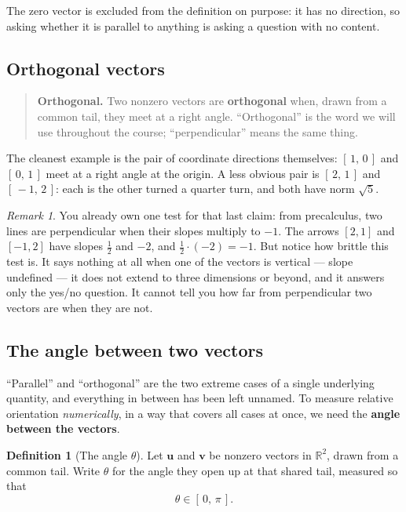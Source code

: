 \documentclass[11pt]{article}
\theoremstyle{definition}
\newtheorem{defn}{Definition}[section]
\theoremstyle{remark}
\newtheorem*{rmk}{Remark}
\newcommand{\R}{\mathbb{R}}
\newcommand{\vc}[1]{\mathbf{#1}}
\begin{document}
\noindent The zero vector is excluded from the definition on purpose: it has no
direction, so asking whether it is parallel to anything is asking a question
with no content.

\subsection{Orthogonal vectors}
\begin{quote}
\textbf{Orthogonal.} Two nonzero vectors are \textbf{orthogonal} when, drawn
from a common tail, they meet at a right angle. ``Orthogonal'' is the word we
will use throughout the course; ``perpendicular'' means the same thing.
\end{quote}

\noindent The cleanest example is the pair of coordinate directions themselves:
$[\,1,\,0\,]$ and $[\,0,\,1\,]$ meet at a right angle at the origin. A less
obvious pair is $[\,2,\,1\,]$ and $[\,-1,\,2\,]$: each is the other turned a
quarter turn, and both have norm $\sqrt5$.

\begin{rmk}
You already own one test for that last claim: from precalculus, two lines are
perpendicular when their slopes multiply to $-1$. The arrows $[2,1]$ and
$[-1,2]$ have slopes $\tfrac12$ and $-2$, and $\tfrac12\cdot(-2)=-1$. But notice
how brittle this test is. It says nothing at all when one of the vectors is
vertical --- slope undefined --- it does not extend to three dimensions or
beyond, and it answers only the yes/no question. It cannot tell you how far from
perpendicular two vectors are when they are not.
\end{rmk}

\subsection{The angle between two vectors}
``Parallel'' and ``orthogonal'' are the two extreme cases of a single underlying
quantity, and everything in between has been left unnamed. To measure relative
orientation \emph{numerically}, in a way that covers all cases at once, we need
the \textbf{angle between the vectors}.

\begin{defn}[The angle $\theta$]
Let $\vc{u}$ and $\vc{v}$ be nonzero vectors in $\R^{2}$, drawn from a common
tail. Write $\theta$ for the angle they open up at that shared tail, measured so
that
\[
  \theta\in[\,0,\,\pi\,].
\]
\end{defn}
\end{document}

